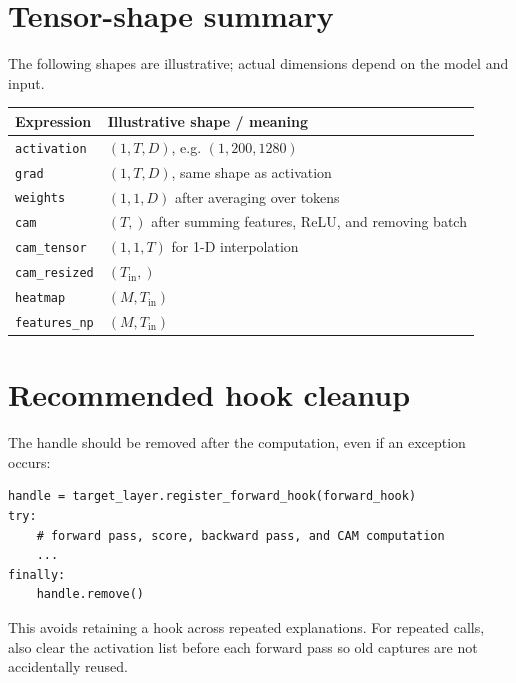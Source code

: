 \documentclass[11pt,a4paper]{article}
\begin{document}
\section{Tensor-shape summary}
The following shapes are illustrative; actual dimensions depend on the model and input.
\begin{center}
\begin{tabularx}{\linewidth}{>{\ttfamily}l X}
\toprule
\textnormal{Expression} & \textnormal{Illustrative shape / meaning}\\
\midrule
\texttt{activation} & $(1,T,D)$, e.g. $(1,200,1280)$\\
\texttt{grad} & $(1,T,D)$, same shape as activation\\
\texttt{weights} & $(1,1,D)$ after averaging over tokens\\
\texttt{cam} & $(T,)$ after summing features, ReLU, and removing batch\\
\texttt{cam\_tensor} & $(1,1,T)$ for 1-D interpolation\\
\texttt{cam\_resized} & $(T_{\mathrm{in}},)$\\
\texttt{heatmap} & $(M,T_{\mathrm{in}})$\\
\texttt{features\_np} & $(M,T_{\mathrm{in}})$\\
\bottomrule
\end{tabularx}
\end{center}

\section{Recommended hook cleanup}
The handle should be removed after the computation, even if an exception occurs:
\begin{lstlisting}[style=python]
handle = target_layer.register_forward_hook(forward_hook)
try:
    # forward pass, score, backward pass, and CAM computation
    ...
finally:
    handle.remove()
\end{lstlisting}
This avoids retaining a hook across repeated explanations. For repeated calls, also clear the activation list before each forward pass so old captures are not accidentally reused.
\end{document}
